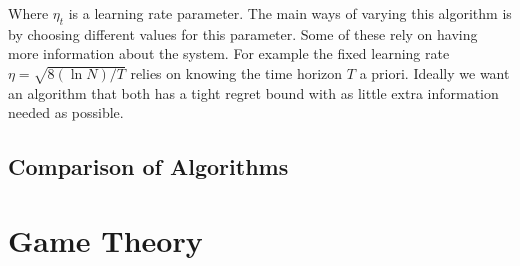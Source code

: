 \documentclass[10pt,a4paper]{article} %
\begin{document}
	Where $\eta_t$ is a learning rate parameter.  The main ways of varying this algorithm is by choosing different values for this parameter.  Some of these rely on having more information about the system.  For example the fixed learning rate $\eta = \sqrt{8 (\ln{N})/T}$ relies on knowing the time horizon $T$ a priori.  Ideally we want an algorithm that both has a tight regret bound with as little extra information needed as possible.
	
	\subsection{Comparison of Algorithms}
	
	\begin{table}[h!]
		\centering

		\label{tab:multicol}
	\end{table}

	\section{Game Theory}
	
\end{document}
